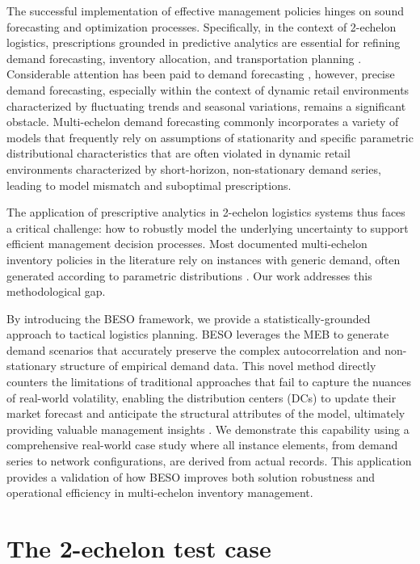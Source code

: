 \documentclass[ijoc,sglanonrev]{informs4}
\begin{document}
The successful implementation of effective management policies hinges on sound forecasting and optimization processes. Specifically, in the context of 2-echelon logistics, prescriptions grounded in predictive analytics are essential for refining demand forecasting, inventory allocation, and transportation planning \citep{A01}. Considerable attention has been paid to demand forecasting \citep{Ma15,Shenstone01}, however, precise demand forecasting, especially within the context of dynamic retail environments characterized by fluctuating trends and seasonal variations, remains a significant obstacle. Multi-echelon demand forecasting commonly incorporates a variety of models that frequently rely on assumptions of stationarity and specific parametric distributional characteristics that are often violated in dynamic retail environments characterized by short-horizon, non-stationary demand series, leading to model mismatch and suboptimal prescriptions.

The application of prescriptive analytics in 2-echelon logistics systems thus faces a critical challenge: how to robustly model the underlying uncertainty to support efficient management decision processes. Most documented multi-echelon inventory policies in the literature rely on instances with generic demand, often generated according to parametric distributions \citep{Escorcia20}. Our work addresses this methodological gap.

By introducing the BESO framework, we provide a statistically-grounded approach to tactical logistics planning. BESO leverages the MEB to generate demand scenarios that accurately preserve the complex autocorrelation and non-stationary structure of empirical demand data. This novel method directly counters the limitations of traditional approaches that fail to capture the nuances of real-world volatility, enabling the distribution centers (DCs) to update their market forecast and anticipate the structural attributes of the model, ultimately providing valuable management insights \citep{P16}. We demonstrate this capability using a comprehensive real-world case study where all instance elements, from demand series to network configurations, are derived from actual records. This application provides a validation of how BESO improves both solution robustness and operational efficiency in multi-echelon inventory management.

\section{The 2-echelon test case} \label{Sec:testcase}
\end{document}
